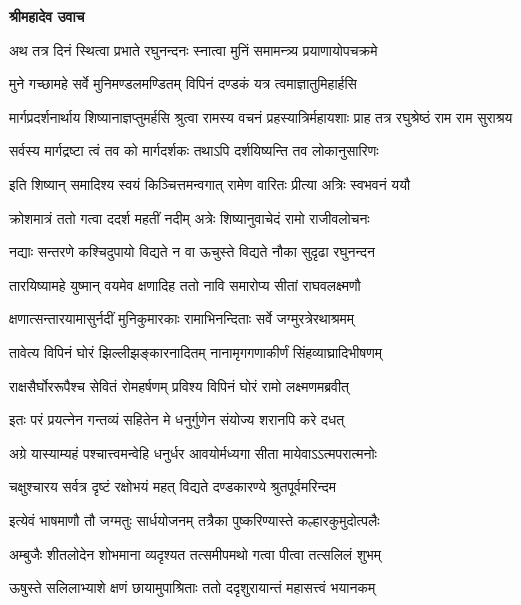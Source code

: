 




\textbf{श्रीमहादेव उवाच}

\twolineshloka
{अथ तत्र दिनं स्थित्वा प्रभाते रघुनन्दनः}
{स्नात्वा मुनिं समामन्त्र्य प्रयाणायोपचक्रमे} %

\twolineshloka
{मुने गच्छामहे सर्वे मुनिमण्डलमण्डितम्}
{विपिनं दण्डकं यत्र त्वमाज्ञातुमिहार्हसि} %

\threelineshloka
{मार्गप्रदर्शनार्थाय शिष्यानाज्ञप्तुमर्हसि}
{श्रुत्वा रामस्य वचनं प्रहस्यात्रिर्महायशाः}
{प्राह तत्र रघुश्रेष्ठं राम राम सुराश्रय} %

\twolineshloka
{सर्वस्य मार्गद्रष्टा त्वं तव को मार्गदर्शकः}
{तथाऽपि दर्शयिष्यन्ति तव लोकानुसारिणः} %

\twolineshloka
{इति शिष्यान् समादिश्य स्वयं किञ्चित्तमन्वगात्}
{रामेण वारितः प्रीत्या अत्रिः स्वभवनं ययौ} %

\twolineshloka
{क्रोशमात्रं ततो गत्वा ददर्श महतीं नदीम्}
{अत्रेः शिष्यानुवाचेदं रामो राजीवलोचनः} %

\twolineshloka
{नद्याः सन्तरणे कश्चिदुपायो विद्यते न वा}
{ऊचुस्ते विद्यते नौका सुदृढा रघुनन्दन} %

\twolineshloka
{तारयिष्यामहे युष्मान् वयमेव क्षणादिह}
{ततो नावि समारोप्य सीतां राघवलक्ष्मणौ} %

\twolineshloka
{क्षणात्सन्तारयामासुर्नदीं मुनिकुमारकाः}
{रामाभिनन्दिताः सर्वे जग्मुरत्रेरथाश्रमम्} %

\twolineshloka
{तावेत्य विपिनं घोरं झिल्लीझङ्कारनादितम्}
{नानामृगगणाकीर्णं सिंहव्याघ्रादिभीषणम्} %

\twolineshloka
{राक्षसैर्घोररूपैश्च सेवितं रोमहर्षणम्}
{प्रविश्य विपिनं घोरं रामो लक्ष्मणमब्रवीत्} %

\twolineshloka
{इतः परं प्रयत्नेन गन्तव्यं सहितेन मे}
{धनुर्गुणेन संयोज्य शरानपि करे दधत्} %

\twolineshloka
{अग्रे यास्याम्यहं पश्चात्त्वमन्वेहि धनुर्धर}
{आवयोर्मध्यगा सीता मायेवाऽऽत्मपरात्मनोः} %

\twolineshloka
{चक्षुश्चारय सर्वत्र दृष्टं रक्षोभयं महत्}
{विद्यते दण्डकारण्ये श्रुतपूर्वमरिन्दम} %

\twolineshloka
{इत्येवं भाषमाणौ तौ जग्मतुः सार्धयोजनम्}
{तत्रैका पुष्करिण्यास्ते कल्हारकुमुदोत्पलैः} %

\twolineshloka
{अम्बुजैः शीतलोदेन शोभमाना व्यदृश्यत}
{तत्समीपमथो गत्वा पीत्वा तत्सलिलं शुभम्} %

\twolineshloka
{ऊषुस्ते सलिलाभ्याशे क्षणं छायामुपाश्रिताः}
{ततो ददृशुरायान्तं महासत्त्वं भयानकम्} %

